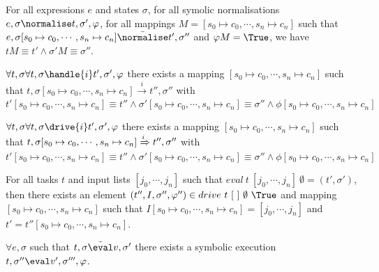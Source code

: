 \begin{lemma}
  \label{lem:soundnorm}

  For all expressions $e$ and states $\sigma$,
  for all symolic normalisations $e,\sigma\normalise t,\sigma',\phi$,
  for all mappings $M=[s_0\mapsto c_0,\cdots,s_n\mapsto c_n]$
  such that $e,\sigma [s_0\mapsto c_0,\cdots,s_n\mapsto c_n] \bar{\normalise}t',\sigma''$ and $\phi M =\True$,
  we have $t M \equiv t' \wedge \sigma' M \equiv \sigma''$.
  
\end{lemma}

\begin{lemma}
  $\forall t,\sigma \forall t,\sigma\handle{i} t',\sigma',\phi$
  there exists a mapping $[s_0\mapsto c_0,\cdots,s_n\mapsto c_n]$
  such that $t,\sigma [s_0\mapsto c_0,\cdots,s_n\mapsto c_n] \xrightarrow[]{i} t'',\sigma''$
  with $t'[s_0\mapsto c_0,\cdots,s_n\mapsto c_n] \equiv t'' \wedge \sigma' [s_0\mapsto c_0,\cdots,s_n\mapsto c_n] \equiv \sigma'' \wedge \phi [s_0\mapsto c_0,\cdots,s_n\mapsto c_n]$
\end{lemma}


\begin{lemma}
  $\forall t,\sigma \forall t,\sigma\drive{i} t',\sigma',\phi$
  there exists a mapping $[s_0\mapsto c_0,\cdots,s_n\mapsto c_n]$
  such that $t,\sigma [s_0\mapsto c_0,\cdots,s_n\mapsto c_n] \xRightarrow[]{i} t'',\sigma''$
  with $t'[s_0\mapsto c_0,\cdots,s_n\mapsto c_n] \equiv t'' \wedge \sigma' [s_0\mapsto c_0,\cdots,s_n\mapsto c_n] \equiv \sigma'' \wedge \phi [s_0\mapsto c_0,\cdots,s_n\mapsto c_n]$
\end{lemma}


\begin{theorem}
For all tasks $t$ and input lists $[j_0,\cdots,j_n]$ such that $eval\ t\ [j_0,\cdots,j_n]\ \emptyset = (t',\sigma')$,
then there exists an element $(t'',I,\sigma'',\phi'')\in drive\ t\ [\ ]\ \emptyset\ \True$ and mapping $[s_0\mapsto c_0,\cdots,s_n\mapsto c_n]$ such that
$I[s_0\mapsto c_0,\cdots,s_n\mapsto c_n]=[j_0,\cdots,j_n]$ and $t'=t''[s_0\mapsto c_0,\cdots,s_n\mapsto c_n]$.
  \label{thm:complete}
\end{theorem}


\begin{lemma}
  $\forall e,\sigma$ such that $t,\sigma \bar{\eval}v,\sigma'$
  there exists a symbolic execution $t,\sigma''\eval v',\sigma''',\phi$.
\end{lemma}

